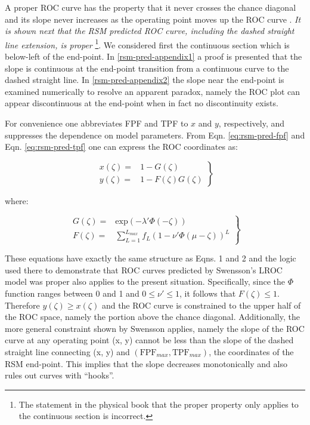 \documentclass[
]{book}
\begin{document}
A proper ROC curve has the property that it never crosses the chance diagonal and its slope never increases as the operating point moves up the ROC curve \citep{metz1999proper, macmillan2004detection}. \emph{It is shown next that the RSM predicted ROC curve, including the dashed straight line extension, is proper} \footnote{The statement in the physical book that the proper property only applies to the continuous section is incorrect.}. We considered first the continuous section which is below-left of the end-point. In \ref{rsm-pred-appendix1} a proof is presented that the slope is continuous at the end-point transition from a continuous curve to the dashed straight line. In \ref{rsm-pred-appendix2} the slope near the end-point is examined numerically to resolve an apparent paradox, namely the ROC plot can appear discontinuous at the end-point when in fact no discontinuity exists.

For convenience one abbreviates FPF and TPF to \(x\) and \(y\), respectively, and suppresses the dependence on model parameters. From Eqn. \eqref{eq:rsm-pred-fpf} and Eqn. \eqref{eq:rsm-pred-tpf} one can express the ROC coordinates as:

\begin{equation}
\left. 
\begin{aligned}
x\left ( \zeta \right ) =& 1 - G\left ( \zeta \right )\\
y\left ( \zeta \right ) =& 1 - F\left ( \zeta \right ) G\left ( \zeta \right ) 
\end{aligned}
\right \}
\label{eq:rsm-pred-f-g}
\end{equation}

where:

\begin{equation}
\left. 
\begin{aligned}
G\left ( \zeta \right ) =& \text{exp}\left ( -\lambda' \Phi \left ( -\zeta \right )\right )\\
F\left ( \zeta \right ) =& \sum_{L=1}^{L_{max}} f_L  \left ( 1 - \nu' \Phi \left ( \mu -\zeta \right ) \right )^L 
\end{aligned}
\right \}
\label{eq:rsm-pred-fg-defs}
\end{equation}

These equations have exactly the same structure as \citep{swensson1996unified} Eqns. 1 and 2 and the logic used there to demonstrate that ROC curves predicted by Swensson's LROC model was proper also applies to the present situation. Specifically, since the \(\Phi\) function ranges between 0 and 1 and \(0 \leq \nu' \leq 1\), it follows that \(F\left ( \zeta \right ) \leq 1\). Therefore \(y\left ( \zeta \right ) \geq x\left ( \zeta \right )\) and the ROC curve is constrained to the upper half of the ROC space, namely the portion above the chance diagonal. Additionally, the more general constraint shown by Swensson applies, namely the slope of the ROC curve at any operating point (x, y) cannot be less than the slope of the dashed straight line connecting (x, y) and \(\left (\text{FPF}_{max}, \text{TPF}_{max} \right )\), the coordinates of the RSM end-point. This implies that the slope decreases monotonically and also rules out curves with ``hooks''.
\end{document}
